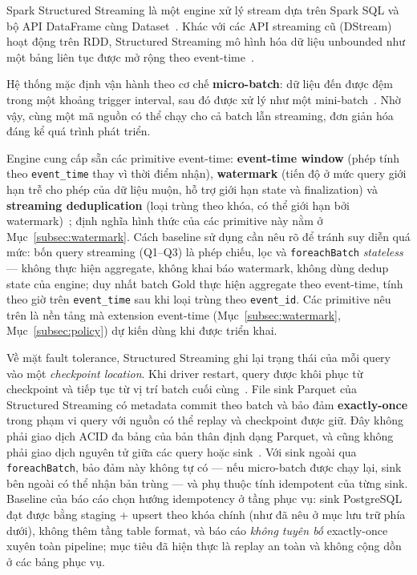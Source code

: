 Spark Structured Streaming là một engine xử lý stream dựa trên Spark SQL
và bộ API DataFrame cùng Dataset~\cite{structured_streaming_sigmod_2018}. Khác với
các API streaming cũ (DStream) hoạt động trên RDD, Structured Streaming
mô hình hóa dữ liệu unbounded như một bảng liên tục được mở rộng theo
event-time~\cite{spark_docs_4_2}.

Hệ thống mặc định vận hành theo cơ chế \textbf{micro-batch}: dữ liệu
đến được đệm trong một khoảng trigger interval, sau đó được xử lý như
một mini-batch~\cite{spark_docs_4_2}. Nhờ vậy, cùng một mã nguồn có
thể chạy cho cả batch lẫn streaming, đơn giản hóa đáng kể quá trình phát
triển.

Engine cung cấp sẵn các primitive event-time: \textbf{event-time window}
(phép tính theo \texttt{event\_time} thay vì thời điểm nhận), \textbf{watermark}
(tiến độ ở mức query giới hạn trễ cho phép của dữ liệu muộn, hỗ trợ giới hạn
state và finalization) và \textbf{streaming deduplication} (loại trùng theo
khóa, có thể giới hạn bởi watermark)~\cite{spark_docs_4_2}; định nghĩa hình
thức của các primitive này nằm ở Mục~\ref{subsec:watermark}. Cách baseline
sử dụng cần nêu rõ để tránh suy diễn quá mức: bốn query streaming (Q1--Q3)
là phép chiếu, lọc và \texttt{foreachBatch} \emph{stateless} --- không thực
hiện aggregate, không khai báo watermark, không dùng dedup state của engine;
duy nhất batch Gold thực hiện aggregate theo event-time, tính theo giờ trên
\texttt{event\_time} sau khi loại trùng theo \texttt{event\_id}. Các
primitive nêu trên là nền tảng mà extension event-time
(Mục~\ref{subsec:watermark}, Mục~\ref{subsec:policy}) dự kiến dùng khi được
triển khai.

Về mặt fault tolerance, Structured Streaming ghi lại trạng thái của
mỗi query vào một \textit{checkpoint location}. Khi driver restart,
query được khôi phục từ checkpoint và tiếp tục từ vị trí batch cuối
cùng~\cite{spark_docs_4_2}. File sink Parquet của Structured Streaming
có metadata commit theo batch và bảo đảm \textbf{exactly-once} trong phạm
vi query với nguồn có thể replay và checkpoint được giữ. Đây không phải
giao dịch ACID đa bảng của bản thân định dạng Parquet, và cũng không phải
giao dịch nguyên tử giữa các query hoặc sink~\cite{spark_docs_4_2,
structured_streaming_sigmod_2018}. Với sink ngoài qua
\texttt{foreachBatch}, bảo đảm này không tự có --- nếu micro-batch được chạy
lại, sink bên ngoài có thể nhận bản trùng --- và phụ thuộc tính idempotent
của từng sink. Baseline của báo cáo chọn hướng idempotency ở tầng phục vụ:
sink PostgreSQL đạt được bằng staging + upsert theo khóa chính (như đã nêu
ở mục lưu trữ phía dưới), không thêm tầng table format, và báo cáo
\emph{không tuyên bố} exactly-once xuyên toàn pipeline; mục tiêu đã hiện
thực là replay an toàn và không cộng dồn ở các bảng phục vụ.

